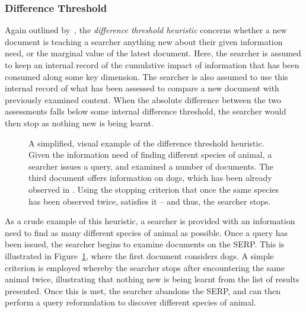 \subsubsection{Difference Threshold}\label{sec:stopping_background:heuristics:judgement:difference}
Again outlined by~\citep{nickles1995judgment}, the \emph{difference threshold heuristic} concerns whether a new document is teaching a searcher anything new about their given information need, or the marginal value of the latest document. Here, the searcher is assumed to keep an internal record of the cumulative impact of information that has been consumed along some key dimension. The searcher is also assumed to use this internal record of what has been assessed to compare a new document with previously examined content. When the absolute difference between the two assessments falls below some internal difference threshold, the searcher would then stop as nothing new is being learnt.

\begin{figure}[t!]
    \centering
    \caption[Difference threshold heuristic]{A simplified, visual example of the difference threshold heuristic. Given the information need of finding different species of animal, a searcher issues a query, and examined a number of documents. The third document offers information on dogs, which has been already observed in . Using the stopping criterion that once the same species has been observed twice,  satisfies it – and thus, the searcher stops.}
    \label{fig:difference_heuristic}
\end{figure}

As a crude example of this heuristic, a searcher is provided with an information need to find as many different species of animal as possible. Once a query has been issued, the searcher begins to examine documents on the SERP. This is illustrated in Figure~\ref{fig:difference_heuristic}, where the first document considers dogs. A simple criterion is employed whereby the searcher stops after encountering the same animal twice, illustrating that nothing new is being learnt from the list of results presented. Once this is met, the searcher abandons the SERP, and can then perform a query reformulation to discover different species of animal.

